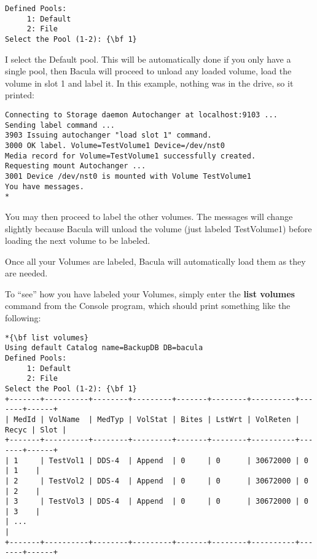 \footnotesize
\begin{verbatim}
Defined Pools:
     1: Default
     2: File
Select the Pool (1-2): {\bf 1}
\end{verbatim}
\normalsize

I select the Default pool. This will be automatically done if you only have a
single pool, then Bacula will proceed to unload any loaded volume, load the
volume in slot 1 and label it. In this example, nothing was in the drive, so
it printed: 

\footnotesize
\begin{verbatim}
Connecting to Storage daemon Autochanger at localhost:9103 ...
Sending label command ...
3903 Issuing autochanger "load slot 1" command.
3000 OK label. Volume=TestVolume1 Device=/dev/nst0
Media record for Volume=TestVolume1 successfully created.
Requesting mount Autochanger ...
3001 Device /dev/nst0 is mounted with Volume TestVolume1
You have messages.
*
\end{verbatim}
\normalsize

You may then proceed to label the other volumes. The messages will change
slightly because Bacula will unload the volume (just labeled TestVolume1)
before loading the next volume to be labeled. 

Once all your Volumes are labeled, Bacula will automatically load them as they
are needed. 

To ``see'' how you have labeled your Volumes, simply enter the {\bf list
volumes} command from the Console program, which should print something like
the following: 

\footnotesize
\begin{verbatim}
*{\bf list volumes}
Using default Catalog name=BackupDB DB=bacula
Defined Pools:
     1: Default
     2: File
Select the Pool (1-2): {\bf 1}
+-------+----------+--------+---------+-------+--------+----------+-------+------+
| MedId | VolName  | MedTyp | VolStat | Bites | LstWrt | VolReten | Recyc | Slot |
+-------+----------+--------+---------+-------+--------+----------+-------+------+
| 1     | TestVol1 | DDS-4  | Append  | 0     | 0      | 30672000 | 0     | 1    |
| 2     | TestVol2 | DDS-4  | Append  | 0     | 0      | 30672000 | 0     | 2    |
| 3     | TestVol3 | DDS-4  | Append  | 0     | 0      | 30672000 | 0     | 3    |
| ...                                                                            |
+-------+----------+--------+---------+-------+--------+----------+-------+------+
\end{verbatim}
\normalsize

